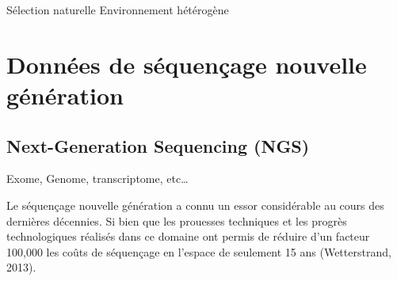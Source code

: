 \documentclass[12pt,twoside]{reedthesis}
\begin{document}
  Sélection naturelle Environnement hétérogène
  
  \section{Données de séquençage nouvelle
  génération}\label{donnees-de-sequencage-nouvelle-generation}
  
  \subsection{Next-Generation Sequencing
  (NGS)}\label{next-generation-sequencing-ngs}
  
  Exome, Genome, transcriptome, etc\ldots{}
  
  Le séquençage nouvelle génération a connu un essor considérable au cours
  des dernières décennies. Si bien que les prouesses techniques et les
  progrès technologiques réalisés dans ce domaine ont permis de réduire
  d'un facteur 100,000 les coûts de séquençage en l'espace de seulement 15
  ans (Wetterstrand, 2013).
  
  \begin{Shaded}
  \end{Shaded}
  
\end{document}
